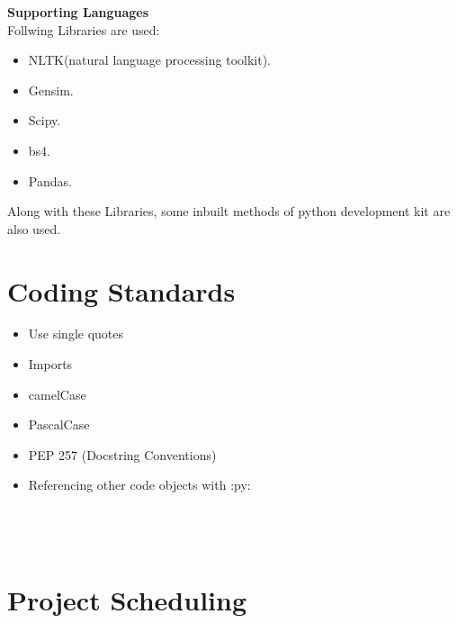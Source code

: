 \textbf{Supporting Languages}\\
Follwing Libraries are used:
\begin{itemize}
	\item NLTK(natural language processing toolkit).
	\item Gensim.
	\item Scipy.
	\item bs4.
	\item Pandas.
\end{itemize}
Along with these Libraries, some inbuilt methods of python development kit are also used.\\

\section{Coding Standards}
\begin{itemize}
	\item Use single quotes
	\item Imports
	\item camelCase
	\item PascalCase
	\item PEP 257 (Docstring Conventions)
	\item Referencing other code objects with :py:\\
	\\
	\\
	\\

	
	
\end{itemize}
\section{Project Scheduling}
